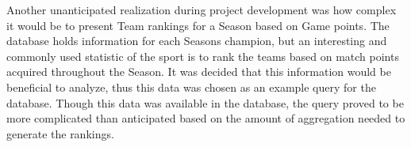 Another unanticipated realization during project development was how complex it would be to present Team rankings for a Season based on Game points. The database holds information for each Seasons champion, but an interesting and commonly used statistic of the sport is to rank the teams based on match points acquired throughout the Season. It was decided that this information would be beneficial to analyze, thus this data was chosen as an example query for the database. Though this data was available in the database, the query proved to be more complicated than anticipated based on the amount of aggregation needed to generate the rankings.